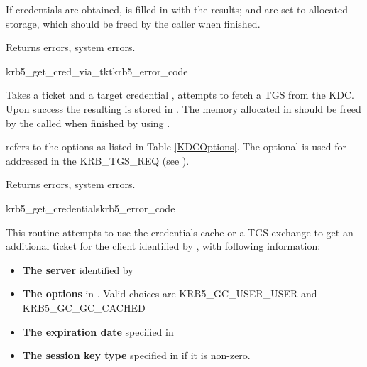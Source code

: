 If credentials are obtained,  is filled in with the results;
 and
 are set to allocated storage,
which should be freed by the caller when finished.

Returns errors, system errors.

\begin{funcdecl}{krb5_get_cred_via_tkt}{krb5_error_code}{\funcinout}
\funcin
{}
\funcout
{}
\end{funcdecl}

Takes a ticket  and a target credential
, attempts to fetch a TGS from the KDC. Upon
success the resulting is stored in . The memory
allocated in  should be freed by the called when
finished by using . 

 refers to the options as listed in Table
\ref{KDCOptions}. The optional  is used for addressed
in the KRB_TGS_REQ (see ).

Returns errors, system errors.


\begin{funcdecl}{krb5_get_credentials}{krb5_error_code}{\funcinout}
\funcin
{}
\funcout
{}
\end{funcdecl}

This routine attempts to use the credentials cache  or a TGS
exchange to get an additional ticket for the client identified by
, with following information: 
\begin{itemize}
\item {\bf The server} identified by  
\item {\bf The options} in .
Valid choices are KRB5_GC_USER_USER and KRB5_GC_GC_CACHED
\item {\bf The expiration date} specified in
\item {\bf The session key type} specified in
 if it is non-zero.
\end{itemize}

